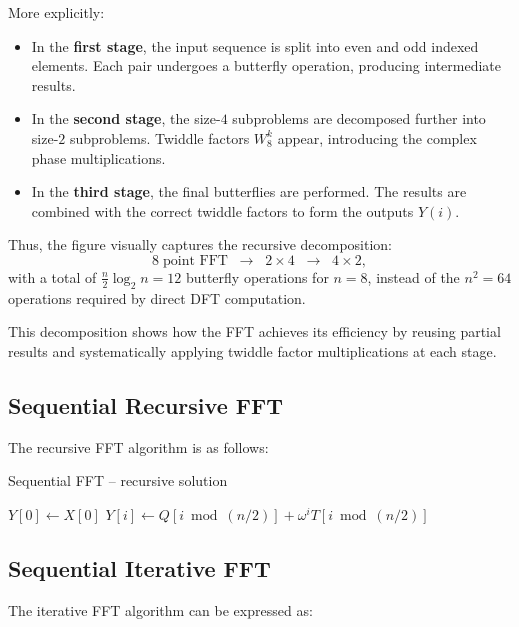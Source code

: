 \documentclass[12pt]{book}
\begin{document}
More explicitly:
\begin{itemize}
    \item In the \textbf{first stage}, the input sequence is split into even and odd indexed elements. Each pair undergoes a butterfly operation, producing intermediate results.
    \item In the \textbf{second stage}, the size-$4$ subproblems are decomposed further into size-$2$ subproblems. Twiddle factors $W_8^k$ appear, introducing the complex phase multiplications.
    \item In the \textbf{third stage}, the final butterflies are performed. The results are combined with the correct twiddle factors to form the outputs $Y(i)$.
\end{itemize}

Thus, the figure visually captures the recursive decomposition:
\[
8 \;\text{point FFT} \;\;\longrightarrow\;\; 2 \times 4 \;\;\longrightarrow\;\; 4 \times 2,
\]
with a total of $\frac{n}{2}\log_2 n = 12$ butterfly operations for $n=8$, instead of the $n^2 = 64$ operations required by direct DFT computation.

This decomposition shows how the FFT achieves its efficiency by reusing partial results and systematically applying twiddle factor multiplications at each stage.

\subsection*{Sequential Recursive FFT}
The recursive FFT algorithm is as follows:

\begin{algorithm}[H]
\caption{Sequential FFT – recursive solution}
\label{alg:seqfft}
\begin{algorithmic}[1]
        \State $Y[0] \gets X[0]$
    \Else
        \State {}
        \State {}
            \State $Y[i] \gets Q[i \bmod (n/2)] + \omega^i T[i \bmod (n/2)]$
        \EndFor
    \EndIf
\EndProcedure
\end{algorithmic}
\end{algorithm}

\subsection*{Sequential Iterative FFT}
The iterative FFT algorithm can be expressed as:
\end{document}

